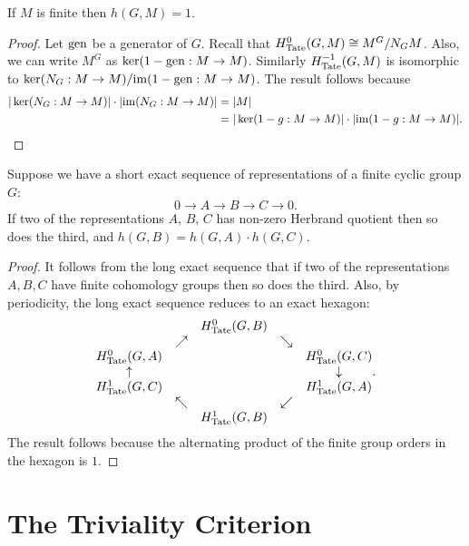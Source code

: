 \begin{lemma} \label{lem:herbrand finite}
	If $M$ is finite then $h(G,M)=1$.
\end{lemma}

\begin{proof}
	Let $\mathrm{gen}$ be a generator of $G$.
	Recall that $H^0_{\mathrm{Tate}}(G,M) \cong M^G / N_GM$.
	Also, we can write $M^G$ as $\ker(1-\mathrm{gen} : M \to M)$.
	Similarly $H^{-1}_{\mathrm{Tate}}(G,M)$ is isomorphic to $\ker (N_G : M \to M) / \mathrm{im} (1-\mathrm{gen} : M \to M)$.
	The result follows because
	\begin{align*}
		|\ker(N_G : M \to M)| \cdot |\mathrm{im}(N_G : M \to M)|
		&=|M|\\
		&=|\ker(1-g : M \to M)| \cdot |\mathrm{im}(1-g : M \to M)|.
	\end{align*}
\end{proof}


\begin{lemma} \label{lem:herbrand ses}
	Suppose we have a short exact sequence of representations of a finite cyclic group $G$:
	\[
		0 \to A \to B \to C \to 0.
	\]
	If two of the representations $A$, $B$, $C$ has non-zero Herbrand quotient then so
	does the third, and $h(G,B) = h(G,A) \cdot h(G,C)$.
\end{lemma}

\begin{proof}
	It follows from the long exact sequence that if two of the representations $A,B,C$
	have finite cohomology groups then so does the third.
	Also, by periodicity, the long exact sequence reduces to an exact hexagon:
	\[
		\begin{matrix}
			&& H^0_{\mathrm{Tate}}(G,B) \\
			&\nearrow && \searrow \\
			H^0_{\mathrm{Tate}}(G,A)  && && H^0_{\mathrm{Tate}}(G,C) \\
			\uparrow & & & & \downarrow \\
			H^1_{\mathrm{Tate}}(G,C) &&&& H^1_{\mathrm{Tate}}(G,A) \\
			& \nwarrow && \swarrow\\
			&& H^1_{\mathrm{Tate}}(G,B)
		\end{matrix}.
	\]
	The result follows because the alternating product of the
	finite group orders in the hexagon is $1$.
\end{proof}






\section{The Triviality Criterion}


